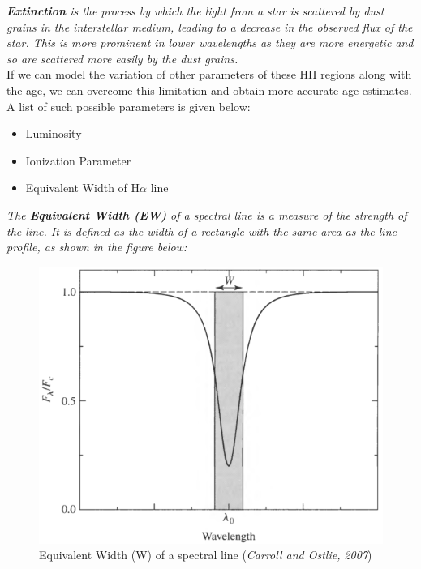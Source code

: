 \documentclass[12pt]{report}
\begin{document}
\textit{\textbf{Extinction} is the process by which the light from a star is scattered by dust grains in the interstellar medium, leading to a decrease in the observed flux of the star. This is more prominent in lower wavelengths as they are more energetic and so are scattered more easily by the dust grains.}\\

If we can model the variation of other parameters of these HII regions along with the age, we can overcome this limitation and obtain more accurate age estimates. A list of such possible parameters is given below:

\begin{itemize}
    \item Luminosity
    \item Ionization Parameter
    \item Equivalent Width of H$\alpha$ line \\
\end{itemize}

\textit{The \textbf{Equivalent Width (EW)} of a spectral line is a measure of the strength of the line. It is defined as the width of a rectangle with the same area as the line profile, as shown in the figure below:}

\begin{figure}[H]
    \centering
    \includegraphics[scale = 0.5]{image3.png}
    \caption{Equivalent Width (W) of a spectral line (\textit{Carroll and Ostlie, 2007})}
    \label{fig:image3}
\end{figure}
\end{document}
